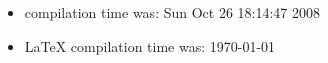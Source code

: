 \documentclass{article}
\begin{document}
\begin{itemize}
  \item \Rlogo{} compilation time was: Sun Oct 26 18:14:47 2008
  \item \LaTeX{} compilation time was: \today
\end{itemize}


\clearpage
{}


\end{document}
